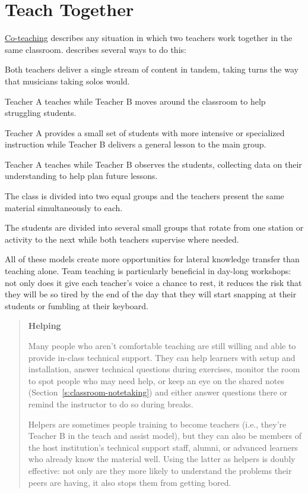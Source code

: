 \section{Teach Together}\label{s:classroom-together}

\protect\hyperlink{g:co-teaching}{Co-teaching} describes any situation in
which two teachers work together in the same classroom.
\cite{Frie2016} describes several ways to do this:

\begin{description}
\tightlist
\item[Team teaching:]
Both teachers deliver a single stream of content in tandem, taking
turns the way that musicians taking solos would.
\item[Teach and assist:]
Teacher A teaches while Teacher B moves around the classroom to help
struggling students.
\item[Alternative teaching:]
Teacher A provides a small set of students with more intensive or
specialized instruction while Teacher B delivers a general lesson to
the main group.
\item[Teach and observe:]
Teacher A teaches while Teacher B observes the students, collecting
data on their understanding to help plan future lessons.
\item[Parallel teaching:]
The class is divided into two equal groups and the teachers present
the same material simultaneously to each.
\item[Station teaching:]
The students are divided into several small groups that rotate from
one station or activity to the next while both teachers supervise
where needed.
\end{description}

All of these models create more opportunities for lateral knowledge
transfer than teaching alone. Team teaching is particularly beneficial
in day-long workshops: not only does it give each teacher's voice a
chance to rest, it reduces the risk that they will be so tired by the
end of the day that they will start snapping at their students or
fumbling at their keyboard.

\begin{quote}\setlength{\parindent}{0pt}
\textbf{Helping}

Many people who aren't comfortable teaching are still willing and able
to provide in-class technical support. They can help learners with
setup and installation, answer technical questions during exercises,
monitor the room to spot people who may need help, or keep an eye on
the shared notes (Section~\ref{s:classroom-notetaking}) and either
answer questions there or remind the instructor to do so during
breaks.

Helpers are sometimes people training to become teachers (i.e.,
they're Teacher B in the teach and assist model), but they can also
be members of the host institution's technical support staff, alumni,
or advanced learners who already know the material well. Using the
latter as helpers is doubly effective: not only are they more likely
to understand the problems their peers are having, it also stops them
from getting bored.
\end{quote}


